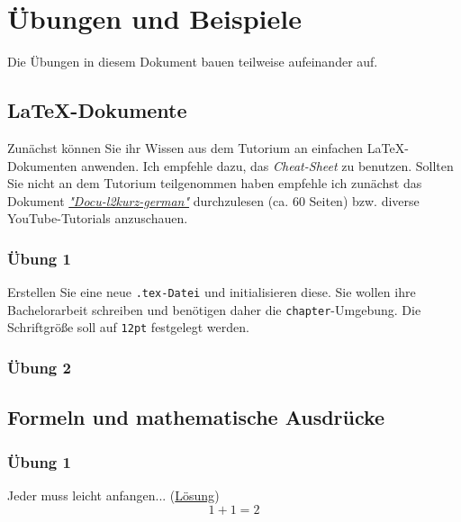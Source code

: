 \documentclass[11pt, oneside, a4paper, titlepage, ngerman]{scrreprt}
\newcommand{\sol}{Lösung}
\begin{document}
\setcounter{secnumdepth}{3}		%
\setcounter{tocdepth}{3}			%

\sffamily

\tableofcontents

\rmfamily

\chapter{Übungen und Beispiele}
\label{cha:exercises}
Die Übungen in diesem Dokument bauen teilweise aufeinander auf.

\section{\LaTeX-Dokumente}
\label{sec:latex}
Zunächst können Sie ihr Wissen aus dem Tutorium an einfachen \LaTeX-Dokumenten anwenden. Ich empfehle dazu, das \textit{Cheat-Sheet} zu benutzen. Sollten Sie nicht an dem Tutorium teilgenommen haben empfehle ich zunächst das Dokument \href{http://mirrors.ibiblio.org/CTAN/info/german/LaTeX2e-Kurzbeschreibung/l2kurz.pdf}{\textit{"Docu-l2kurz-german"}} durchzulesen (ca. 60 Seiten) bzw. diverse YouTube-Tutorials anzuschauen.

\subsection{Übung 1}
\label{sub:latex1}
Erstellen Sie eine neue \texttt{.tex-Datei} und initialisieren diese. Sie wollen ihre Bachelorarbeit schreiben und benötigen daher die \texttt{chapter}-Umgebung. Die Schriftgröße soll auf \texttt{12pt} festgelegt werden.

\subsection{Übung 2}
\label{sub:latex2}

\section{Formeln und mathematische Ausdrücke}
\label{sec:math}

\subsection{Übung 1}
\label{sub:math1}
Jeder muss leicht anfangen... (\hyperref[sub:math1_sol]{\sol}) {\large
\begin{equation}
	1 + 1 = 2 
\end{equation} }
\end{document}
